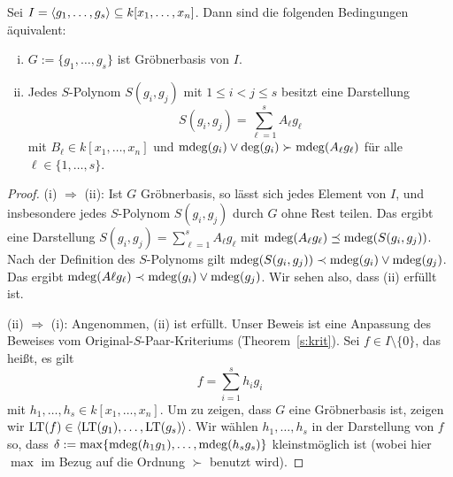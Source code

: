 \documentclass[11pt]{article}
\numberwithin{equation}{section}
\begin{document}
\begin{theorem} \label{var:S:krit}
	Sei $I = \left< g_1,\ldots, g_s \right> \subseteq k[x_1,\ldots,x_n]$. Dann sind die folgenden Bedingungen äquivalent: 
	\begin{enumerate}[(i)]
		\item $G := \{g_1,\ldots,g_s\}$ ist Gröbnerbasis von $I$. 
		\item Jedes $S$-Polynom $S(g_i,g_j)$ mit $1 \le i < j \le s$ besitzt eine Darstellung 
		\[
				S(g_i,g_j) = \sum_{\ell=1}^s A_\ell g_\ell 
		\]
		mit $B_\ell \in k[x_1,\ldots,x_n]$ und $\operatorname{mdeg} (g_i) \vee \deg (g_i) \succ \operatorname{mdeg} (A_\ell g_\ell)$ für alle $\ell \in \{1,\ldots,s\}$. 
	\end{enumerate} 
\end{theorem} 
\begin{proof}
	(i) $\Rightarrow$ (ii): Ist $G$ Gröbnerbasis, so lässt sich jedes Element von $I$, und insbesondere jedes $S$-Polynom $S(g_i,g_j)$ durch $G$ ohne Rest teilen. Das ergibt eine Darstellung $S(g_i,g_j) = \sum_{\ell =1}^s A_\ell g_\ell$ mit $\operatorname{mdeg} ( A_\ell g_\ell) \preceq \operatorname{mdeg} (S(g_i,g_j))$. Nach der Definition des $S$-Polynoms gilt $\operatorname{mdeg}(S(g_i,g_j)) \prec \operatorname{mdeg}(g_i) \vee \operatorname{mdeg}(g_j)$. Das ergibt $\operatorname{mdeg}(A \ell g_\ell) \prec \operatorname{mdeg}(g_i) \vee \operatorname{mdeg}(g_j)$. Wir sehen also, dass (ii) erfüllt ist. 
	
	(ii) $\Rightarrow$ (i): Angenommen, (ii) ist erfüllt. Unser Beweis ist eine Anpassung des Beweises vom Original-$S$-Paar-Kriteriums (Theorem~\ref{s:krit}). Sei $f \in I \setminus \{0\}$, das heißt, es gilt 
	\[
		f = \sum_{i=1}^s h_i g_i
	\]
	mit $h_1,\ldots,h_s \in k[x_1,\ldots,x_n]$. Um zu zeigen, dass $G$ eine Gröbnerbasis ist, zeigen wir $\operatorname{LT}(f) \in \left< \operatorname{LT}(g_1),\ldots, \operatorname{LT}(g_s) \right>$. Wir wählen $h_1,\ldots,h_s$ in der Darstellung von $f$ so, dass $\delta  := \max \{ \operatorname{mdeg}(h_1 g_1) ,\ldots, \operatorname{mdeg}(h_s g_s)  \}$ kleinstmöglich ist (wobei hier $\max$ im Bezug auf die Ordnung $\succ$ benutzt wird). 
	

\end{proof}
\end{document}
